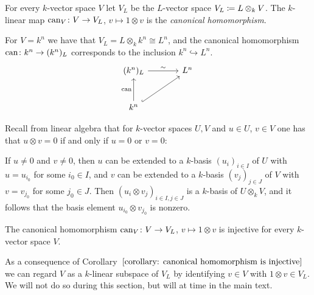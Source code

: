 \begin{definition}
  For every $k$-vector space $V$ let $V_L$ be the $L$-vector space $V_L \coloneqq L \otimes_k V$.
  The $k$-linear map $\operatorname{can}_V \colon V \to V_L$, $v \mapsto 1 \otimes v$ is the \emph{canonical homomorphism}.
\end{definition}


\begin{example}
  \label{example: extension of scalars for kn}
  For $V = k^n$ we have that $V_L = L \otimes_k k^n \cong L^n$, and the canonical homomorphism $\operatorname{can} \colon k^n \to (k^n)_L$ corresponds to the inclusion $k^n \hookrightarrow L^n$.
  \[
    \begin{tikzcd}[sep = large]
        (k^n)_L
        \arrow{r}[above]{\sim}
      & L^n
      \\
        k^n
        \arrow{u}[left]{\can}
        \arrow[hookrightarrow]{ur}
      & {}
    \end{tikzcd}
  \]
\end{example}


\begin{recall}
  Recall from linear algebra that for $k$-vector spaces $U, V$ and $u \in U$, $v \in V$ one has that $u \otimes v = 0$ if and only if $u = 0$ or $v = 0$:
  
  If $u \neq 0$ and $v \neq 0$, then $u$ can be extended to a $k$-basis $(u_i)_{i \in I}$ of $U$ with $u = u_{i_0}$ for some $i_0 \in I$, and $v$ can be extended to a $k$-basis $(v_j)_{j \in J}$ of $V$ with $v = v_{j_0}$ for some $j_0 \in J$.
  Then $(u_i \otimes v_j)_{i \in I, j \in J}$ is a $k$-basis of $U \otimes_k V$, and it follows that the basis element $u_{i_0} \otimes v_{j_0}$ is nonzero.
\end{recall}


\begin{corollary}
  \label{corollary: canonical homomorphism is injective}
  The canonical homomorphism $\operatorname{can}_V \colon V \to V_L$, $v \mapsto 1 \otimes v$ is injective for every $k$-vector space $V$.
\end{corollary}


\begin{fluff}
  As a consequence of Corollary~$\ref{corollary: canonical homomorphism is injective}$ we can regard $V$ as a $k$-linear subspace of $V_L$ by identifying $v \in V$ with $1 \otimes v \in V_L$.
  We will not do so during this section, but will at time in the main text.
\end{fluff}


